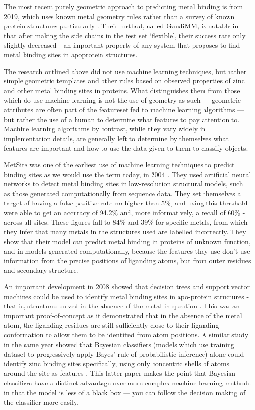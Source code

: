 The most recent purely geometric approach to predicting metal binding is from 2019, which uses known metal geometry rules rather than a survey of known protein structures particularly \cite{sciortino2019}. Their method, called GaudiMM, is notable in that after making the side chains in the test set `flexible', their success rate only slightly decreased - an important property of any system that proposes to find metal binding sites in apoprotein structures.

The research outlined above did not use machine learning techniques, but rather simple geometric templates and other rules based on observed properties of zinc and other metal binding sites in proteins. What distinguishes them from those which do use machine learning is not the use of geometry as such --- geometric attributes are often part of the featureset fed to machine learning algorithms --- but rather the use of a human to determine what features to pay attention to. Machine learning algorithms by contrast, while they vary widely in implementation details, are generally left to determine by themselves what features are important and how to use the data given to them to classify objects.


MetSite was one of the earliest use of machine learning techniques to predict binding sites as we would use the term today, in 2004 \cite{sodhi2004predicting}. They used artificial neural networks to detect metal binding sites in low-resolution structural models, such as those generated computationally from sequence data. They set themselves a target of having a false positive rate no higher than 5\%, and using this threshold were able to get an  accuracy of 94.2\% and, more informatively, a recall of 60\% - across all sites. These figures fall to 84\% and 39\% for specific metals, from which they infer that many metals in the structures used are labelled incorrectly. They show that their model can predict metal binding in proteins of unknown function, and in models generated computationally, because the features they use don't use information from the precise positions of liganding atoms, but from outer residues and secondary structure.

An important development in 2008 showed that decision trees and support vector machines could be used to identify metal binding sites in apo-protein structures - that is, structures solved in the absence of the metal in question \cite{babor2008}. This was an important proof-of-concept as it demonstrated that in the absence of the metal atom, the liganding residues are still sufficiently close to their liganding conformation to allow them to be identified from atom positions. A similar study in the same year showed that Bayesian classifiers (models which use training dataset to progressively apply Bayes' rule of probabilistic inference) alone could identify zinc binding sites specifically, using only concentric shells of atoms around the site as features \cite{ebert2008}. This latter paper makes the point that Bayesian classifiers have a distinct advantage over more complex machine learning methods in that the model is less of a black box --- you can follow the decision making of the classifier more easily.

